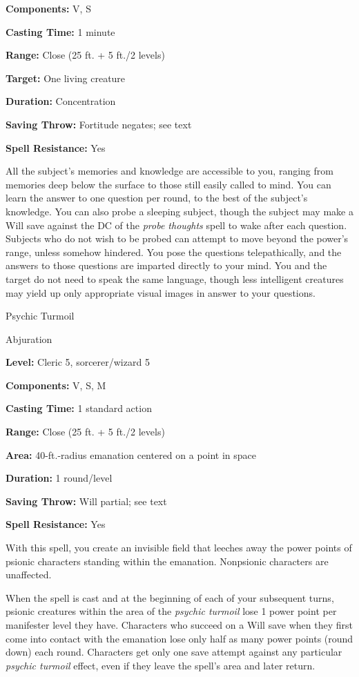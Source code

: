 \documentclass{article}
\begin{document}
\textbf{Components:} V, S

\textbf{Casting Time:} 1 minute

\textbf{Range:} Close (25 ft. + 5 ft./2 levels)

\textbf{Target:} One living creature

\textbf{Duration:} Concentration

\textbf{Saving Throw:} Fortitude negates; see text

\textbf{Spell Resistance:} Yes

All the subject's memories and knowledge are accessible to you, ranging from memories 
deep below the surface to those still easily called to mind. You can learn the 
answer to one question per round, to the best of the subject's knowledge. You can 
also probe a sleeping subject, though the subject may make a Will save against 
the DC of the \textit{probe thoughts }spell to wake after each question. Subjects 
who do not wish to be probed can attempt to move beyond the power's range, unless 
somehow hindered. You pose the questions telepathically, and the answers to those 
questions are imparted directly to your mind. You and the target do not need to 
speak the same language, though less intelligent creatures may yield up only appropriate 
visual images in answer to your questions.

\vspace{12pt}
Psychic Turmoil

Abjuration

\textbf{Level:} Cleric 5, sorcerer/wizard 5

\textbf{Components:} V, S, M

\textbf{Casting Time:} 1 standard action

\textbf{Range:} Close (25 ft. + 5 ft./2 levels)

\textbf{Area:} 40-ft.-radius emanation centered on a point in space

\textbf{Duration:} 1 round/level

\textbf{Saving Throw:} Will partial; see text

\textbf{Spell Resistance:} Yes

With this spell, you create an invisible field that leeches away the power points 
of psionic characters standing within the emanation. Nonpsionic characters are 
unaffected.

When the spell is cast and at the beginning of each of your subsequent turns, psionic 
creatures within the area of the \textit{psychic turmoil }lose 1 power point per 
manifester level they have. Characters who succeed on a Will save when they first 
come into contact with the emanation lose only half as many power points (round 
down) each round. Characters get only one save attempt against any particular \textit{psychic 
turmoil }effect, even if they leave the spell's area and later return.
\end{document}
